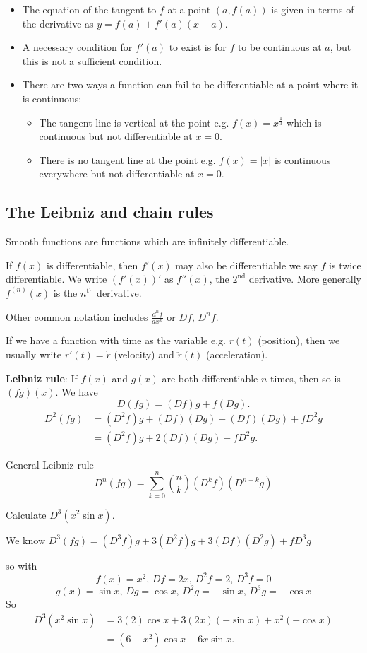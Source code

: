 \documentclass[10pt, a4paper]{article}
\begin{document}
\begin{itemize}
    \item The equation of the tangent to $f$ at a point $(a, f(a))$ is given in terms of the derivative as $y = f(a) + f'(a)(x - a)$.
    \item A necessary condition for $f'(a)$ to exist is for $f$ to be continuous at $a$, but this is not a sufficient condition.
    \item There are two ways a function can fail to be differentiable at a point where it is continuous:
        \begin{itemize}
            \item The tangent line is vertical at the point e.g. $f(x) = x ^ {\frac{1}{3}}$ which is continuous but not differentiable at $x = 0$.
            \item There is no tangent line at the point e.g. $f(x) = |x|$ is continuous everywhere but not differentiable at $x = 0$.
        \end{itemize}
\end{itemize}

\subsection{The Leibniz and chain rules}
Smooth functions are functions which are infinitely differentiable.

If $f(x)$ is differentiable, then $f'(x)$ may also be differentiable we say $f$ is twice differentiable. We write $(f'(x))'$ as $f''(x)$, the $2 ^ {\text{nd}}$ derivative. More generally $f^{(n)}(x)$ is the $n^{\text{th}}$ derivative.

Other common notation includes $\frac{d^nf}{dx^n}$ or $Df,\,D^nf$.

If we have a function with time as the variable e.g. $r(t)$ (position), then we usually write $r'(t) = \dot{r}$ (velocity) and $\ddot{r}(t)$ (acceleration).

\textbf{Leibniz rule}: If $f(x)$ and $g(x)$ are both differentiable $n$ times, then so is $(fg)(x)$. We have
\[
D(fg) = (Df)g + f(Dg).
\]
\begin{align*}
    D^2(fg) &= (D^2f)g + (Df)(Dg) + (Df)(Dg) + fD ^ 2g \\
    &= (D^2f)g + 2(Df)(Dg) + fD^2g.
\end{align*}

General Leibniz rule
\[
D^n(fg) = \sum_{k = 0}^{n}\binom{n}{k}(D ^ kf)(D ^ {n - k}g)
\]

\begin{example}
    Calculate $D ^ 3(x ^ 2 \sin x)$.

    We know $D ^ 3(fg) = (D ^ 3 f)g + 3(D ^ 2f)g + 3(Df)(D ^ 2 g) + f D ^ 3g$
    
    so with
    \[
    f(x) = x ^ 2,\,Df = 2x,\,D^2f = 2,\,D^3f = 0
    \]
    \[
    g(x) = \sin x,\,Dg = \cos x,\,D^2g = -\sin x,\,D ^ 3g = -\cos x
    \]
    So
    \begin{align*}
        D ^ 3(x ^ 2 \sin x) &= 3(2)\cos x + 3(2x)(-\sin x) + x ^ 2(-\cos x) \\
        &= (6 - x ^ 2)\cos x - 6x\sin x.
    \end{align*}
\end{example}
\end{document}
